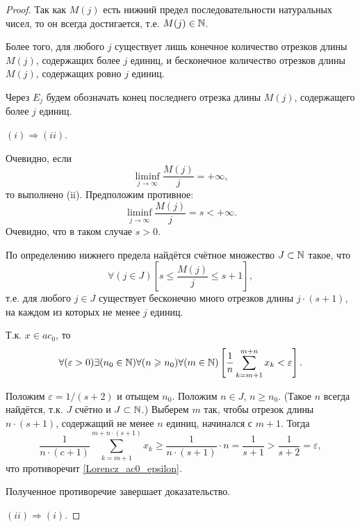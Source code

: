 \begin{proof}
Так как $M(j)$ есть нижний предел последовательности натуральных чисел,
то он всегда достигается,
т.е. $M(j)\in\mathbb{N}$.

Более того, для любого $j$ существует лишь конечное количество отрезков длины $M(j)$,
содержащих более $j$ единиц,
и бесконечное количество отрезков длины $M(j)$,
содержащих ровно $j$ единиц.

Через $E_j$ будем обозначать конец последнего отрезка длины $M(j)$,
содержащего более $j$ единиц.

$(i) \Rightarrow (ii).$

Очевидно, если
\begin{equation}
	\liminf_{j \to \infty} \frac{M(j)}{j} = +\infty
	,
\end{equation}
то выполнено (ii).
Предположим противное:
\begin{equation}
	\liminf_{j \to \infty} \frac{M(j)}{j} = s < +\infty
	.
\end{equation}
Очевидно, что в таком случае $s>0$.

По определению нижнего предела найдётся счётное множество
$J\subset\mathbb{N}$ такое, что
\begin{equation}
	\forall(j\in J)\left[s \leq \frac{M(j)}{j} \leq s+1 \right],
\end{equation}
т.е. для любого $j\in J$ существует бесконечно много отрезков длины $j\cdot(s+1)$,
на каждом из которых не менее $j$ единиц.

Т.к. $x\in ac_0$, то
\begin{equation}\label{Lorencz_ac0_epsilon}
	\forall(\varepsilon>0)
	\exists(n_0\in\mathbb{N})
	\forall(n \geqslant n_0)
	\forall(m\in\mathbb{N})
	\left[
		\frac{1}{n} \sum_{k=m+1}^{m+n}x_k < \varepsilon
	\right]
	.
\end{equation}

Положим $\varepsilon = 1/(s+2)$ и отыщем $n_0$.
Положим $n\in J$, $n\geq n_0$.
(Такое $n$ всегда найдётся, т.к. $J$ счётно и $J\subset\mathbb{N}$.)
Выберем $m$ так, чтобы отрезок длины $n\cdot(s+1)$,
содержащий не менее $n$ единиц,
начинался с $m+1$.
Тогда
\begin{equation}
	\frac{1}{n\cdot(c+1)}\sum_{k=m+1}^{m+n\cdot(s+1)}x_k
	\geq
	\frac{1}{n\cdot(s+1)} \cdot n
	=
	\frac{1}{s+1}
	>
	\frac{1}{s+2}
	=
	\varepsilon,
\end{equation}
что противоречит \eqref{Lorencz_ac0_epsilon}.

Полученное противоречие завершает доказательство.

$(ii) \Rightarrow (i).$



\end{proof}
